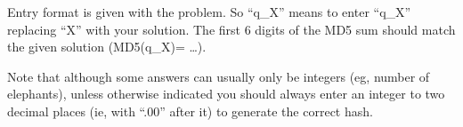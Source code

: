 Entry format is given with the problem. So ``q\_X'' means to enter ``q\_X'' replacing ``X'' with your solution. The first 6 digits of the MD5 sum should match the given solution (MD5(q\_X)= \ldots).

Note that although some answers can usually only be integers (eg, number of elephants), unless otherwise indicated you should always enter an integer to two decimal places (ie, with ``.00'' after it) to generate the correct hash.

